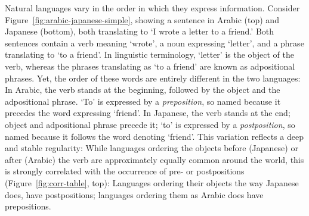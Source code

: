 \documentclass[9pt,twocolumn,twoside,lineno]{pnas-new}
\begin{document}



Natural languages vary in the order in which they express information.
Consider Figure~\ref{fig:arabic-japanese-simple}, showing a sentence in Arabic (top) and Japanese (bottom), both translating to `I wrote a letter to a friend.'
Both sentences contain a verb meaning `wrote', a noun expressing  `letter', and a phrase translating to `to a friend'.
In linguistic terminology, `letter' is the object of the verb, whereas the phrases translating as `to a friend' are known as adpositional phrases.
Yet, the order of these words are entirely different in the two languages:
In Arabic, the verb stands at the beginning, followed by the object and the adpositional phrase.
`To' is expressed by a \emph{preposition}, so named because it precedes the word expressing `friend'. %
In Japanese, the verb stands at the end; object and adpositional phrase precede it; `to' is expressed by a \textit{postposition}, so named because it follows the word denoting `friend'.
This variation reflects a deep and stable regularity:
While languages ordering the objects before (Japanese) or after (Arabic) the verb are approximately equally common around the world,
this is strongly correlated with the occurrence of pre- or postpositions (Figure~\ref{fig:corr-table}, top):
Languages ordering their objects the way Japanese does, have postpositions; languages ordering them as Arabic does have prepositions.
\end{document}
